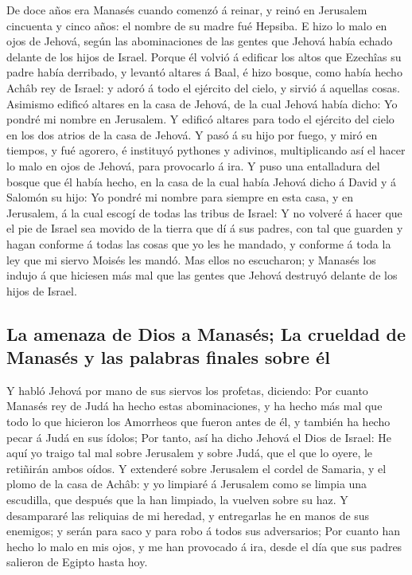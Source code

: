  De doce años era Manasés cuando comenzó á reinar, y reinó
en Jerusalem cincuenta y cinco años: el nombre de su madre fué Hepsiba.
 E hizo lo malo en ojos de Jehová, según las abominaciones
de las gentes que Jehová había echado delante de los hijos de Israel.
 Porque él volvió á edificar los altos que Ezechîas su
padre había derribado, y levantó altares á Baal, é hizo bosque, como
había hecho Achâb rey de Israel: y adoró á todo el ejército del cielo, y
sirvió á aquellas cosas.  Asimismo edificó altares en la
casa de Jehová, de la cual Jehová había dicho: Yo pondré mi nombre en
Jerusalem.  Y edificó altares para todo el ejército del
cielo en los dos atrios de la casa de Jehová.  Y pasó á su
hijo por fuego, y miró en tiempos, y fué agorero, é instituyó pythones y
adivinos, multiplicando así el hacer lo malo en ojos de Jehová, para
provocarlo á ira.  Y puso una entalladura del bosque que
él había hecho, en la casa de la cual había Jehová dicho á David y á
Salomón su hijo: Yo pondré mi nombre para siempre en esta casa, y en
Jerusalem, á la cual escogí de todas las tribus de Israel:
 Y no volveré á hacer que el pie de Israel sea movido de
la tierra que dí á sus padres, con tal que guarden y hagan conforme á
todas las cosas que yo les he mandado, y conforme á toda la ley que mi
siervo Moisés les mandó.  Mas ellos no escucharon; y
Manasés los indujo á que hiciesen más mal que las gentes que Jehová
destruyó delante de los hijos de Israel.

\hypertarget{la-amenaza-de-dios-a-manasuxe9s-la-crueldad-de-manasuxe9s-y-las-palabras-finales-sobre-uxe9l}{%
\subsection{La amenaza de Dios a Manasés; La crueldad de Manasés y las
palabras finales sobre
él}\label{la-amenaza-de-dios-a-manasuxe9s-la-crueldad-de-manasuxe9s-y-las-palabras-finales-sobre-uxe9l}}

 Y habló Jehová por mano de sus siervos los profetas,
diciendo:  Por cuanto Manasés rey de Judá ha hecho estas
abominaciones, y ha hecho más mal que todo lo que hicieron los Amorrheos
que fueron antes de él, y también ha hecho pecar á Judá en sus ídolos;
 Por tanto, así ha dicho Jehová el Dios de Israel: He
aquí yo traigo tal mal sobre Jerusalem y sobre Judá, que el que lo
oyere, le retiñirán ambos oídos.  Y extenderé sobre
Jerusalem el cordel de Samaria, y el plomo de la casa de Achâb: y yo
limpiaré á Jerusalem como se limpia una escudilla, que después que la
han limpiado, la vuelven sobre su haz.  Y desampararé las
reliquias de mi heredad, y entregarlas he en manos de sus enemigos; y
serán para saco y para robo á todos sus adversarios;  Por
cuanto han hecho lo malo en mis ojos, y me han provocado á ira, desde el
día que sus padres salieron de Egipto hasta hoy.

